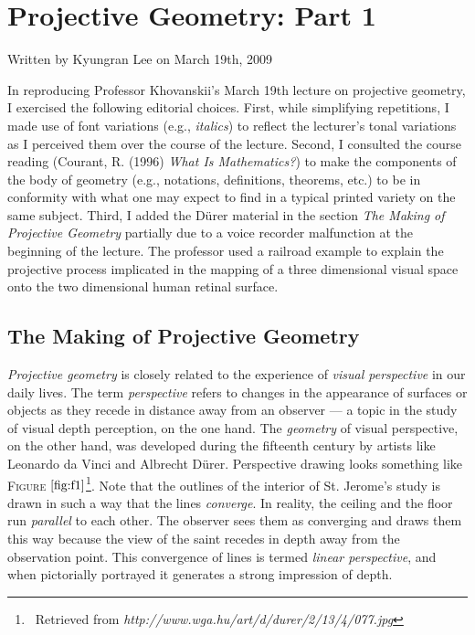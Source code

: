 \chapter{Projective Geometry: Part 1}
{Written by Kyungran Lee on March 19th, 2009} 

{In reproducing Professor Khovanskii's March 19th lecture on projective geometry, I exercised the following editorial choices. First, while simplifying repetitions, I made use of font variations (e.g., \emph{italics}) to reflect the lecturer's tonal variations as I perceived them over the course of the lecture. Second, I consulted the course reading (Courant, R. (1996) \textit{What Is Mathematics?}) to make the components of the body of geometry (e.g., notations, definitions, theorems, etc.) to be in conformity with what one may expect to find in a typical printed variety on the same subject. Third, I added the D\"urer material in the section \textit{The Making of Projective Geometry} partially due to a voice recorder malfunction at the beginning of the lecture. The professor used a railroad example to explain the projective process implicated in the mapping of a three dimensional visual space onto the two dimensional human retinal surface. }






\section{The Making of Projective Geometry}

\emph{Projective geometry} is closely related to the experience of \emph{visual perspective} in our daily lives.
The term \textit{perspective} refers to changes in the appearance of surfaces or objects as they recede in distance away from an observer --- a topic in the study of visual depth perception, on the one hand. The \emph{geometry} of visual perspective, on the other hand, was developed during the fifteenth century by artists like Leonardo da Vinci and Albrecht D\"urer. Perspective drawing looks something like \textsc{Figure }$\ref{fig:f1}$\footnote{\ Retrieved from \textit{http://www.wga.hu/art/d/durer/2/13/4/077.jpg}}.
Note that the outlines of the interior of St. Jerome's study is drawn in such a way that the lines \textit{converge}. In reality, the ceiling and the floor run \textit{parallel} to each other. The observer sees them as converging and draws them this way because the view of the saint recedes in depth away from the observation point. This convergence of lines is termed \textit{linear perspective}, and when pictorially portrayed it generates a strong impression of depth.

